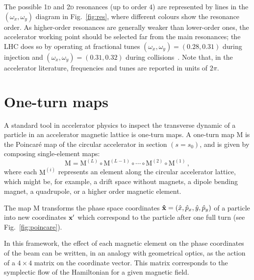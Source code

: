 The possible 1\textsc{d} and 2\textsc{d} resonances (up to order $4$) are represented by lines in the $(\omega_x, \omega_y)$ diagram in Fig.~\ref{fig:res}, where different colours show the resonance order. As higher-order resonances are generally weaker than lower-order ones, the accelerator working point should be selected far from the main resonances; the LHC does so by operating at fractional tunes $(\omega_x, \omega_y)=(0.28, 0.31)$ during injection and $(\omega_x, \omega_y)=(0.31, 0.32)$ during collisions~\cite{Benedikt:823808}. Note that, in the accelerator literature, frequencies and tunes are reported in units of $2\pi$. 

\section{One-turn maps} \label{sec:acc:oneturn}

A standard tool in accelerator physics to inspect the transverse dynamic of a particle in an accelerator magnetic lattice is one-turn maps. A one-turn map \(\mathrm{M}\) is the Poincaré map of the circular accelerator in section $(s = s_0)$, and is given by composing single-element maps:
\begin{equation}
	\mathrm{M} = \mathrm{M}^{(L)} \circ \mathrm{M}^{(L - 1)} \circ \cdots \circ \mathrm{M}^{(2)} \circ \mathrm{M}^{(1)} \,,
\end{equation}
where each $\mathrm{M}^{(i)}$ represents an element along the circular accelerator lattice, which might be, for example, a drift space without magnets, a dipole bending magnet, a quadrupole, or a higher order magnetic element. 

The map \(\mathrm{M}\) transforms the phase space coordinates \(\vb{\hat x} = (\hat x, \hat p_x, \hat y, \hat p_y)\) of a particle into new coordinates \(\vb{x}'\) which correspond to the particle after one full turn (see Fig.~\ref{fig:poincare}).

In this framework, the effect of each magnetic element on the phase coordinates of the beam can be written, in an analogy with geometrical optics, as the action of a $4\times4$ matrix on the coordinate vector. This matrix corresponds to the symplectic flow of the Hamiltonian for a given magnetic field.

